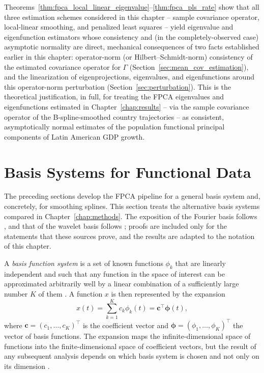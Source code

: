 Theorems~\ref{thm:fpca_local_linear_eigenvalue}--\ref{thm:fpca_pls_rate}
show that all three estimation schemes considered in this chapter --
sample covariance operator, local-linear smoothing, and penalized least
squares -- yield eigenvalue and eigenfunction estimators whose consistency
and (in the completely-observed case) asymptotic normality are direct,
mechanical consequences of two facts established earlier in this chapter:
operator-norm (or Hilbert--Schmidt-norm) consistency of the estimated
covariance operator for $\Gamma$ (Section~\ref{sec:mean_cov_estimation}),
and the linearization of eigenprojections, eigenvalues, and eigenfunctions
around this operator-norm perturbation (Section~\ref{sec:perturbation}).
This is the theoretical justification, in full, for treating the FPCA
eigenvalues and eigenfunctions estimated in Chapter~\ref{chap:results} --
via the sample covariance operator of the B-spline-smoothed country
trajectories -- as consistent, asymptotically normal estimates of the
population functional principal components of Latin American GDP growth.

\section{Basis Systems for Functional Data}
\label{sec:basis_systems}

The preceding sections develop the FPCA pipeline for a general basis
system and, concretely, for smoothing splines. This section treats the
alternative basis systems compared in Chapter~\ref{chap:methods}. The
exposition of the Fourier basis follows \cite[Ch.~3--4]{ramsay2005}, and that
of the wavelet basis follows \cite{vidakovic1999};
proofs are included only for the statements that these sources prove, and
the results are adapted to the notation of this chapter.

A \emph{basis function system} is a set of known functions $\phi_k$ that are
linearly independent and such that any function in the space of interest can
be approximated arbitrarily well by a linear combination of a sufficiently
large number $K$ of them \cite[Sec.~3.3]{ramsay2005}. A function $x$ is then
represented by the expansion
\begin{equation}
x(t) = \sum_{k=1}^{K} c_k\phi_k(t) = \mathbf{c}^\top\boldsymbol{\phi}(t),
\label{eq:basis_expansion_theory}
\end{equation}
where $\mathbf{c} = (c_1,\dots,c_K)^\top$ is the coefficient vector and
$\boldsymbol{\phi} = (\phi_1,\dots,\phi_K)^\top$ the vector of basis
functions. The expansion maps the infinite-dimensional space of functions
into the finite-dimensional space of coefficient vectors, but the result of
any subsequent analysis depends on which basis system is chosen and not
only on its dimension \cite[Sec.~3.3]{ramsay2005}.

